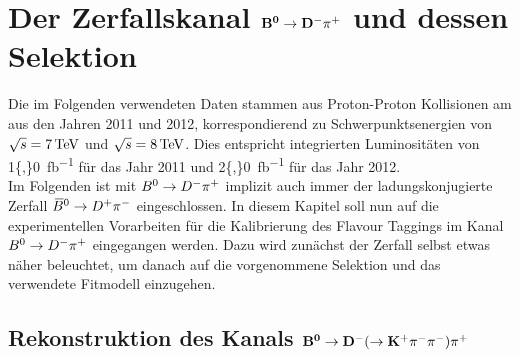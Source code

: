 \chapter[head={Der Zerfallskanal $\Bz\rightarrow \Dm\pip$ und dessen Selektion},tocentry={Der Zerfallskanal $\mathbf{\Bz\rightarrow \Dm\pip}$ und dessen Selektion}]{Der Zerfallskanal $\mathbf{\Bz\rightarrow \Dm\pip}$ und dessen Selektion}

Die im Folgenden verwendeten Daten stammen aus Proton-Proton Kollisionen am \lhc aus den Jahren 2011 und 2012, korrespondierend zu Schwerpunktsenergien von $\protect\sqrt{s}=\SI{7}{TeV}$ und $\protect\sqrt{s}=\SI{8}{TeV}$. Dies entspricht integrierten Luminositäten von \SI{1{,}0}{fb^{-1}} für das Jahr 2011 und \SI{2{,}0}{fb^{-1}} für das Jahr 2012.\\
Im Folgenden ist mit $\Bz\rightarrow \Dm\pip$ implizit auch immer der ladungskonjugierte Zerfall ${{\kern 0.18em\overline{\kern -0.18em B}{}}{}^0}\rightarrow {\ensuremath{{D}^+}}{\ensuremath{{\pi}^-}}$ eingeschlossen. In diesem Kapitel soll nun auf die experimentellen Vorarbeiten für die Kalibrierung des Flavour Taggings im Kanal $\Bz\rightarrow \Dm\pip$ eingegangen werden. Dazu wird zunächst der Zerfall selbst etwas näher beleuchtet, um danach auf die vorgenommene Selektion und das verwendete Fitmodell einzugehen.

\section[head={Rekonstruktion des Kanals $\Bz\rightarrow \Dm(\rightarrow \Kp\pim\pim)\pip$},tocentry={Rekonstruktion des Kanals $\Bz\rightarrow \Dm(\rightarrow \Kp\pim\pim)\pip$}]{Rekonstruktion des Kanals $\mathbf{{{B}^0}\rightarrow {\ensuremath{{D}^-}}(\rightarrow {\ensuremath{{K}^+}}{\ensuremath{{\pi}^-}}{\ensuremath{{\pi}^-}}){{\pi}^+}}$}

